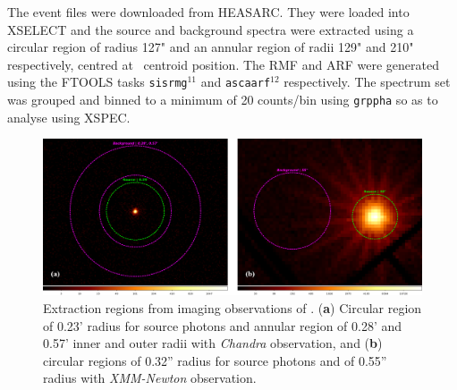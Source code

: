     	The event files were downloaded from HEASARC. They were loaded into XSELECT and the source and background spectra were extracted using a circular region of radius 127" and an annular region of radii 129" and 210" respectively, centred at \source\ centroid position. The RMF and ARF were generated using the FTOOLS tasks \texttt{sisrmg}$^{11}$ and \texttt{ascaarf}$^{12}$ respectively. The spectrum set was grouped and binned to a minimum of 20 counts/bin using \texttt{grppha} so as to analyse using XSPEC.
    	
    	\begin{figure}[!htb]
	        \centering
	        \includegraphics[width=\textwidth]{figures/rx-j0925-7-4758_src-bkg}
	        \caption{Extraction regions from imaging observations of \source. (\textbf{a}) Circular region of 0.23' radius for source photons and annular region of 0.28' and 0.57' inner and outer radii with \textit{Chandra} observation, and (\textbf{b}) circular regions of 0.32'' radius for source photons and of 0.55'' radius with \textit{XMM-Newton} observation.}
	        \label{fig:src-bkg}
	    \end{figure}
	    
    

